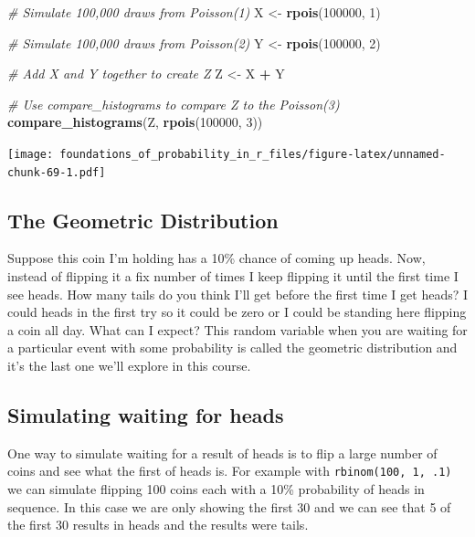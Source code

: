 \documentclass[]{article}
\newenvironment{Shaded}{\begin{snugshade}}{\end{snugshade}}
\newcommand{\CommentTok}[1]{\textcolor[rgb]{0.56,0.35,0.01}{\textit{#1}}}
\newcommand{\DecValTok}[1]{\textcolor[rgb]{0.00,0.00,0.81}{#1}}
\newcommand{\KeywordTok}[1]{\textcolor[rgb]{0.13,0.29,0.53}{\textbf{#1}}}
\newcommand{\NormalTok}[1]{#1}
\newcommand{\OperatorTok}[1]{\textcolor[rgb]{0.81,0.36,0.00}{\textbf{#1}}}
\newcommand{\StringTok}[1]{\textcolor[rgb]{0.31,0.60,0.02}{#1}}
\begin{document}
\begin{Shaded}
\begin{Highlighting}[]
\CommentTok{# Simulate 100,000 draws from Poisson(1)}
\NormalTok{X <-}\StringTok{ }\KeywordTok{rpois}\NormalTok{(}\DecValTok{100000}\NormalTok{, }\DecValTok{1}\NormalTok{)}

\CommentTok{# Simulate 100,000 draws from Poisson(2)}
\NormalTok{Y <-}\StringTok{ }\KeywordTok{rpois}\NormalTok{(}\DecValTok{100000}\NormalTok{, }\DecValTok{2}\NormalTok{)}

\CommentTok{# Add X and Y together to create Z}
\NormalTok{Z <-}\StringTok{ }\NormalTok{X }\OperatorTok{+}\StringTok{ }\NormalTok{Y}

\CommentTok{# Use compare_histograms to compare Z to the Poisson(3)}
\KeywordTok{compare_histograms}\NormalTok{(Z, }\KeywordTok{rpois}\NormalTok{(}\DecValTok{100000}\NormalTok{, }\DecValTok{3}\NormalTok{))}
\end{Highlighting}
\end{Shaded}

\texttt{[image: foundations\_of\_probability\_in\_r\_files/figure-latex/unnamed-chunk-69-1.pdf]}

\hypertarget{the-geometric-distribution}{%
\subsection{The Geometric
Distribution}\label{the-geometric-distribution}}

Suppose this coin I'm holding has a 10\% chance of coming up heads. Now,
instead of flipping it a fix number of times I keep flipping it until
the first time I see heads. How many tails do you think I'll get before
the first time I get heads? I could heads in the first try so it could
be zero or I could be standing here flipping a coin all day. What can I
expect? This random variable when you are waiting for a particular event
with some probability is called the geometric distribution and it's the
last one we'll explore in this course.

\hypertarget{simulating-waiting-for-heads}{%
\subsection{Simulating waiting for
heads}\label{simulating-waiting-for-heads}}

One way to simulate waiting for a result of heads is to flip a large
number of coins and see what the first of heads is. For example with
\texttt{rbinom(100,\ 1,\ .1)} we can simulate flipping 100 coins each
with a 10\% probability of heads in sequence. In this case we are only
showing the first 30 and we can see that 5 of the first 30 results in
heads and the results were tails.
\end{document}
